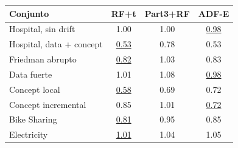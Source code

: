 \begin{tabularx}{\textwidth}{X *{3}{c}}
\toprule
Conjunto & RF+t & Part3+RF & ADF-E \\
\midrule
Hospital, sin drift & 1.00 & 1.00 & \underline{0.98} \\
Hospital, data + concept & \underline{0.53} & 0.78 & 0.53 \\
Friedman abrupto & \underline{0.82} & 1.03 & 0.83 \\
Data fuerte & 1.01 & 1.08 & \underline{0.98} \\
Concept local & \underline{0.58} & 0.69 & 0.72 \\
Concept incremental & 0.85 & 1.01 & \underline{0.72} \\
Bike Sharing & \underline{0.81} & 0.95 & 0.85 \\
Electricity & \underline{1.01} & 1.04 & 1.05 \\
\bottomrule
\end{tabularx}
